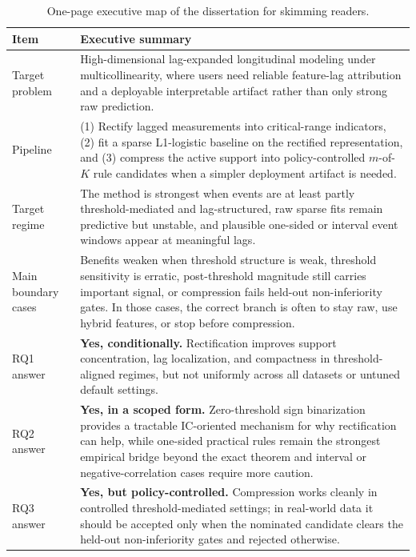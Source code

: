\begin{table}[p]
    \caption[Executive map of the dissertation.]{One-page executive map of the dissertation for skimming readers.}
    \label{tab:executive_map}
    \centering
    {
    \setlength{\tabcolsep}{3pt}
    \renewcommand{\arraystretch}{0.96}
    \begin{tabularx}{0.96\textwidth}{>{\RaggedRight\arraybackslash}p{}>{\RaggedRight\arraybackslash}X}
        Item & Executive summary \\ \hline
        Target problem & High-dimensional lag-expanded longitudinal modeling under multicollinearity, where users need reliable feature-lag attribution and a deployable interpretable artifact rather than only strong raw prediction. \\ \hline
        Pipeline & (1) Rectify lagged measurements into critical-range indicators, (2) fit a sparse L1-logistic baseline on the rectified representation, and (3) compress the active support into policy-controlled $m$-of-$K$ rule candidates when a simpler deployment artifact is needed. \\ \hline
        Target regime & The method is strongest when events are at least partly threshold-mediated and lag-structured, raw sparse fits remain predictive but unstable, and plausible one-sided or interval event windows appear at meaningful lags. \\ \hline
        Main boundary cases & Benefits weaken when threshold structure is weak, threshold sensitivity is erratic, post-threshold magnitude still carries important signal, or compression fails held-out non-inferiority gates. In those cases, the correct branch is often to stay raw, use hybrid features, or stop before compression. \\ \hline
        RQ1 answer & \textbf{Yes, conditionally.} Rectification improves support concentration, lag localization, and compactness in threshold-aligned regimes, but not uniformly across all datasets or untuned default settings. \\ \hline
        RQ2 answer & \textbf{Yes, in a scoped form.} Zero-threshold sign binarization provides a tractable IC-oriented mechanism for why rectification can help, while one-sided practical rules remain the strongest empirical bridge beyond the exact theorem and interval or negative-correlation cases require more caution. \\ \hline
        RQ3 answer & \textbf{Yes, but policy-controlled.} Compression works cleanly in controlled threshold-mediated settings; in real-world data it should be accepted only when the nominated candidate clears the held-out non-inferiority gates and rejected otherwise. \\ \hline
    \end{tabularx}
    }
\end{table}

